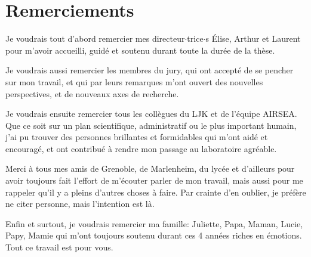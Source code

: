 \documentclass[../../Main_ManuscritThese.tex]{subfiles}
\begin{document}
\chapter*{Remerciements}
\TitleBtwLines
{}
{}
\pagestyle{empty}

Je voudrais tout d'abord remercier mes directeur$\cdot$trice$\cdot$s
Élise, Arthur et Laurent pour m'avoir accueilli, guidé et soutenu
durant toute la durée de la thèse.

Je voudrais aussi remercier les membres du jury, qui ont accepté de se
pencher sur mon travail, et qui par leurs remarques m'ont ouvert des
nouvelles perspectives, et de nouveaux axes de recherche.

Je voudrais ensuite remercier tous les collègues du LJK et de l'équipe
AIRSEA. Que ce soit sur un plan scientifique, administratif ou le plus
important humain, j'ai pu trouver des personnes brillantes et
formidables qui m'ont aidé et encouragé, et ont contribué à rendre mon
passage au laboratoire agréable.

Merci à tous mes amis de Grenoble, de Marlenheim, du lycée et
d'ailleurs pour avoir toujours fait l'effort de m'écouter parler de
mon travail, mais aussi pour me rappeler qu'il y a pleins d'autres
choses à faire. Par crainte d'en oublier, je préfère ne citer
personne, mais l'intention est là.

Enfin et surtout, je voudrais remercier ma famille: Juliette, Papa,
Maman, Lucie, Papy, Mamie qui m'ont toujours soutenu durant ces
 4 années riches en émotions. Tout ce travail est pour vous.

\markchapterend
\end{document}
